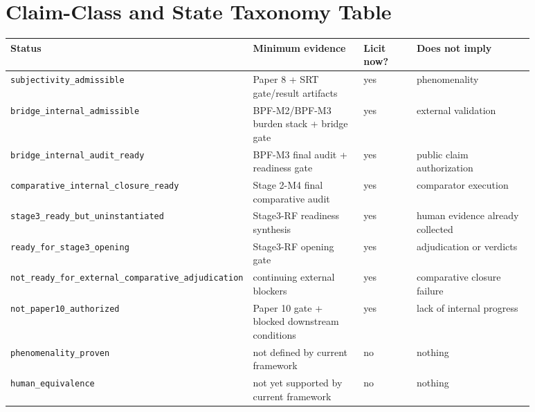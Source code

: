 \documentclass[11pt,a4paper]{article}
\theoremstyle{definition}
\begin{document}
\section{Claim-Class and State Taxonomy Table}
\begin{center}
\small
\begin{tabularx}{\linewidth}{@{}p{0.23\linewidth}p{0.26\linewidth}p{0.12\linewidth}p{0.27\linewidth}@{}}
\toprule
Status & Minimum evidence & Licit now? & Does not imply \\
\midrule
\texttt{subjectivity\_admissible} & Paper 8 + SRT gate/result artifacts & yes & phenomenality \\
\texttt{bridge\_internal\_admissible} & BPF-M2/BPF-M3 burden stack + bridge gate & yes & external validation \\
\texttt{bridge\_internal\_audit\_ready} & BPF-M3 final audit + readiness gate & yes & public claim authorization \\
\texttt{comparative\_internal\_closure\_ready} & Stage 2-M4 final comparative audit & yes & comparator execution \\
\texttt{stage3\_ready\_but\_uninstantiated} & Stage3-RF readiness synthesis & yes & human evidence already collected \\
\texttt{ready\_for\_stage3\_opening} & Stage3-RF opening gate & yes & adjudication or verdicts \\
\texttt{not\_ready\_for\_external\_comparative\_adjudication} & continuing external blockers & yes & comparative closure failure \\
\texttt{not\_paper10\_authorized} & Paper 10 gate + blocked downstream conditions & yes & lack of internal progress \\
\texttt{phenomenality\_proven} & not defined by current framework & no & nothing \\
\texttt{human\_equivalence} & not yet supported by current framework & no & nothing \\
\bottomrule
\end{tabularx}
\end{center}
\end{document}
